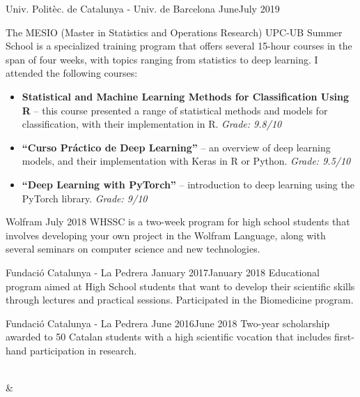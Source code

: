 \documentclass[a4paper, 11pt]{article}
\begin{document}
\begin{longtabu}
                 {Univ. Politèc. de Catalunya - Univ. de Barcelona}
                 {June}{July 2019}
                 {}
                 {The MESIO (Master in Statistics and Operations Research) UPC-UB Summer School is a specialized training program that offers several 15-hour courses in the span of four weeks, with topics ranging from statistics to deep learning. I attended the following courses:
                     \begin{itemize}
                         \item \textbf{Statistical and Machine Learning Methods for Classification Using R} -- this course presented a range of statistical methods and models for classification, with their implementation in R. \textit{Grade: 9.8/10}
                         \item \textbf{``Curso Práctico de Deep Learning''} -- an overview of deep learning models, and their implementation with Keras in R or Python. \textit{Grade: 9.5/10}
                         \item \textbf{``Deep Learning with PyTorch''} -- introduction to deep learning using the PyTorch library. \textit{Grade: 9/10}
                     \end{itemize}
                 }
     
                  {Wolfram}
                  {July 2018}{}{}
                  {WHSSC is a two-week program for high school students that involves developing your own project in the Wolfram Language, along with several seminars on computer science and new technologies.}
                  
     \smallskip
     {Fundació Catalunya - La Pedrera}
     {January 2017}{January 2018}{}
     {Educational program aimed at High School students that want to develop their scientific skills through lectures and practical sessions. Participated in the Biomedicine program.}
     
     \smallskip
     {Fundació Catalunya - La Pedrera}
     {June 2016}{June 2018}{}
     {Two-year scholarship awarded to 50 Catalan students with a high scientific vocation that includes first-hand participation in research.}
     
     \\
     
      &
     \cvsectionrule
     

\end{longtabu}
\end{document}
